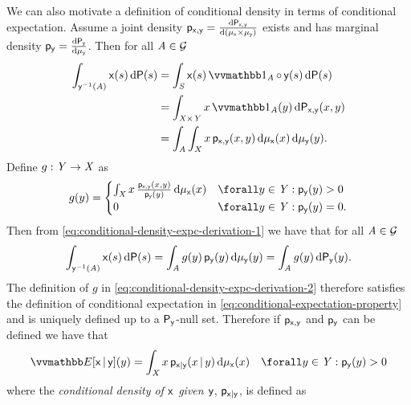 We can also motivate a definition of conditional density in terms of conditional expectation. Assume a joint density $\mathsf{p}_{\mathsf{x},\mathsf{y}} = \frac{\mathrm{d} \mathsf{P}_{\mathsf{x},\mathsf{y}}}{\mathrm{d} (\mu_{\mathsf{x}}\times\mu_{\mathsf{y}})}$ exists and has marginal density $\mathsf{p}_{\mathsf{y}} = \frac{\mathrm{d} \mathsf{P}_{\mathsf{y}}}{\mathrm{d} \mu_{\mathsf{y}}}$. Then for all $\mathit{A} \in \mathcal{G}$
\begin{align}
  \int_{\rvar{y}^{-1}(\set{A})} \rvar{x}(s) \, \dr\probability(s) 
    &= \int_{\set{S}} \rvar{x}(s) \ind{\set{A}} \circ \, \rvar{y}(s) \,\dr\probability(s)\\
    &= \int_{\set{X}\times\set{Y}} x \ind{\set{A}}(y) \,\dr\prob{\rvar{x},\rvar{y}}(x,y)\\
    &= \int_{\set{A}} \int_{\set{X}} 
      x \, \pden{\rvar{x},\rvar{y}}(x,y) 
    \,\dr\mu_{\rvar{x}}(x) \,\dr\mu_{\rvar{y}}(y). \label{eq:conditional-density-expc-derivation-1}
\end{align}
Define $g : \mathit{Y} \to \mathit{X}$ as
\begin{equation}\label{eq:conditional-density-expc-derivation-2}
  g(y) = 
  \begin{cases}
    \int_{\set{X}} x \, \frac{\pden{\rvar{x},\rvar{y}}(x,y)}{\pden{\rvar{y}}(y)} \,\dr\mu_{\rvar{x}}(x)
    & \forall y \in \set{Y} : \pden{\rvar{y}}(y) > 0\\
    0 & \forall y \in \set{Y} : \pden{\rvar{y}}(y) = 0.
  \end{cases}
\end{equation}
Then from \eqref{eq:conditional-density-expc-derivation-1} we have that for all $\mathit{A} \in \mathcal{G}$
\begin{equation}
  \int_{\mathsf{y}^{-1}(\mathit{A})} \mathsf{x}(s) \, \mathrm{d}\mathsf{P}(s)
  =
  \int_{\mathit{A}} g(y) \, \mathsf{p}_{\mathsf{y}}(y) \,\mathrm{d}\mu_{\mathsf{y}}(y)
  =
  \int_{\mathit{A}} g(y) \,\mathrm{d}\mathsf{P}_{\mathsf{y}}(y).
\end{equation}
The definition of $g$ in \eqref{eq:conditional-density-expc-derivation-2} therefore satisfies the definition of conditional expectation in \eqref{eq:conditional-expectation-property} and is uniquely defined up to a $\mathsf{P}_{\mathsf{y}}$-null set. Therefore if $\mathsf{p}_{\mathsf{x},\mathsf{y}}$ and $\mathsf{p}_{\mathsf{y}}$ can be defined we have that 
\begin{equation}\label{eq:conditional-expectation-density}
  \expc{\rvar{x}\gvn\rvar{y}}(y) =
  \int_{\set{X}} x\,\pden{\rvar{x}|\rvar{y}}(x\gvn y) \,\dr\mu_{\rvar{x}}(x)
  \quad \forall y \in \set{Y} : \pden{\rvar{y}}(y) > 0
\end{equation}
where the \emph{conditional density of $\mathsf{x}$ given $\mathsf{y}$}, $\mathsf{p}_{\mathsf{x}|\mathsf{y}}$, is defined as
